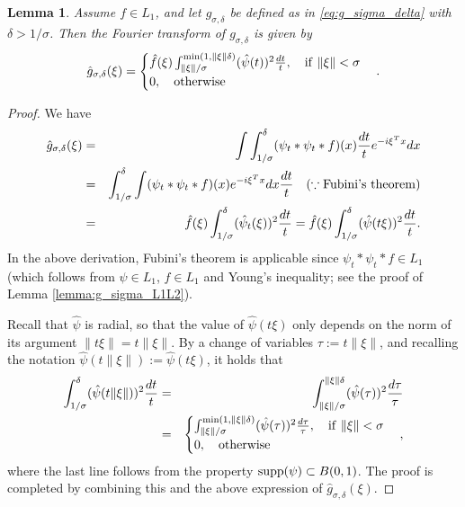 \documentclass[11pt]{article}
\newtheorem{lemma}[theorem]{Lemma}
\theoremstyle{remark}
\theoremstyle{example}
\theoremstyle{remark}
\begin{document}
\begin{lemma} \label{lemma:g_sigma_delta_fourier}
Assume $f \in L_1$, and let $g_{\sigma,\delta}$ be defined as in \eqref{eq:g_sigma_delta} with $\delta > 1/\sigma$.
Then the Fourier transform of $g_{\sigma,\delta}$ is given by
\[
\hat{g}_{\sigma,\delta}(\xi) =
\begin{cases} 
\hat{f}(\xi)  \int_{\| \xi \| / \sigma}^{\min(1, \| \xi \| \delta)} (\hat{\psi} (t) )^2  \frac{dt}{t}, \quad {\rm if}\ \| \xi \| < \sigma\\
0,\quad {\rm otherwise}
\end{cases}.
\]%
\end{lemma}
\begin{proof}
We have
\begin{eqnarray*}
\hat{g}_{\sigma,\delta}(\xi) 
&=& \int \int_{1/\sigma}^\delta ({\psi}_t * \psi_t * f)(x) \frac{dt}{t} e^{- i \xi^T x} dx \\
&=& \int_{1/\sigma}^\delta  \int  ({\psi}_t * \psi_t * f)(x) e^{- i \xi^T x} dx  \frac{dt}{t} \quad (\because {\rm Fubini\mathchar`'s\ theorem}) \\
&=& \hat{f}(\xi)  \int_{1/\sigma}^\delta (\hat{\psi}_t (\xi) )^2  \frac{dt}{t}
= \hat{f}(\xi)  \int_{1/\sigma}^\delta (\hat{\psi} (t\xi) )^2  \frac{dt}{t}.
\end{eqnarray*}
In the above derivation, Fubini's theorem is applicable since $\psi_t * \psi_t * f \in L_1$ (which follows from $\psi \in L_1$, $f \in L_1$ and Young's inequality; see the proof of Lemma \ref{lemma:g_sigma_L1L2}).

Recall that $\hat{\psi}$ is radial, so that the value of $\hat{\psi}(t \xi)$ only depends on the norm of its argument $\| t \xi \| = t \| \xi \|$.
By a change of variables $\tau := t \| \xi \|$, and recalling the notation $\hat{\psi}(t \| \xi \| ) := \hat{\psi}(t\xi)$, it holds that
\begin{eqnarray}
\int_{1/\sigma}^\delta (\hat{\psi} (t \|\xi\| ) )^2  \frac{dt}{t} 
&=&\int_{ \| \xi \| / \sigma }^{ \| \xi \| \delta } ( \hat{\psi}(\tau) )^2 \frac{d\tau}{\tau} \nonumber\\
&=&
\begin{cases} 
\int_{\| \xi \| / \sigma}^{\min(1, \| \xi \| \delta)} (\hat{\psi} (\tau) )^2  \frac{d\tau}{\tau}, \quad {\rm if}\ \| \xi \| < \sigma\\
0,\quad {\rm otherwise}
\end{cases},
\end{eqnarray}
where the last line follows from the property ${\rm supp}(\psi) \subset B(0,1)$.
The proof is completed by combining this and the above expression of $\hat{g}_{\sigma,\delta}(\xi)$.
\end{proof}
\end{document}

